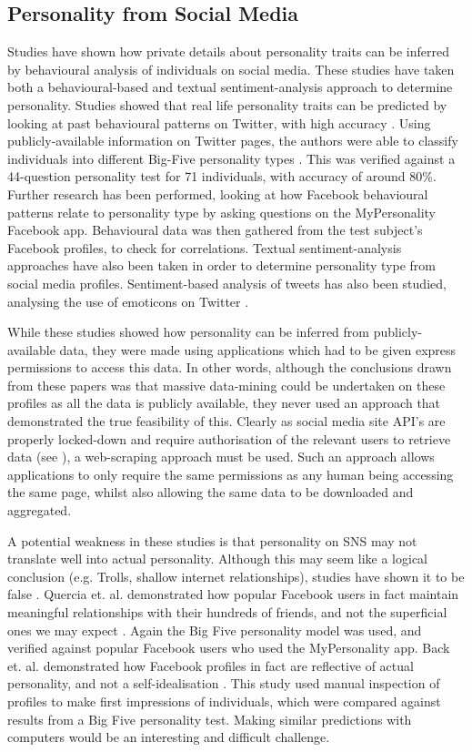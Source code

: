 
\subsection{Personality from Social Media}

Studies have shown how private details about personality traits can be inferred by behavioural analysis of individuals on social media. These studies have taken both a behavioural-based and textual sentiment-analysis approach to determine personality. Studies showed that real life personality traits can be predicted by looking at past behavioural patterns on Twitter, with high accuracy \cite{}. Using publicly-available information on Twitter pages, the authors were able to classify individuals into different Big-Five personality types \cite{}. This was verified against a 44-question personality test for 71 individuals, with accuracy of around 80\%. Further research has been performed, looking at how Facebook behavioural patterns relate to personality type by asking questions on the MyPersonality Facebook app. Behavioural data was then gathered from the test subject's Facebook profiles, to check for correlations. Textual sentiment-analysis approaches have also been taken in order to determine personality type 
from social media profiles. Sentiment-based analysis of tweets has also been studied, analysing the use of emoticons on Twitter \cite{}.

While these studies showed how personality can be inferred from publicly-available data, they were made using applications which had to be given express permissions to access this data. In other words, although the conclusions drawn from these papers was that massive data-mining could be undertaken on these profiles as all the data is publicly available, they never used an approach that demonstrated the true feasibility of this. Clearly as social media site API's are properly locked-down and require authorisation of the relevant users to retrieve data (see \cite{}), a web-scraping approach must be used. Such an approach allows applications to only require the same permissions as any human being accessing the same page, whilst also allowing the same data to be downloaded and aggregated. 

A potential weakness in these studies is that personality on SNS may not translate well into actual personality. Although this may seem like a logical conclusion (e.g. Trolls, shallow internet relationships), studies have shown it to be false \cite{}. Quercia et. al. demonstrated how popular Facebook users in fact maintain meaningful relationships with their hundreds of friends, and not the superficial ones we may expect \cite{}. Again the Big Five personality model was used, and verified against popular Facebook users who used the MyPersonality app. Back et. al. demonstrated how Facebook profiles in fact are reflective of actual personality, and not a self-idealisation \cite{}. This study used manual inspection of profiles to make first impressions of individuals, which were compared against results from a Big Five personality test. Making similar predictions with computers would be an interesting and difficult challenge. 

